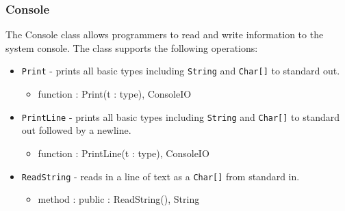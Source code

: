 \documentclass[12pt]{article}
\begin{document}
\subsubsection{Console}
The Console class allows programmers to read and write information to the system console.    The class supports the following operations:
\begin{itemize}
\item \texttt{Print} - prints all basic types including
  \texttt{String} and \texttt{Char[]} to standard out.
  \begin{itemize}
  \item function : Print(t : type), ConsoleIO
  \end{itemize}
\item \texttt{PrintLine} - prints all basic types including
  \texttt{String} and \texttt{Char[]} to standard out followed by a
  newline.
  \begin{itemize}
  \item function : PrintLine(t : type), ConsoleIO
  \end{itemize}
\item \texttt{ReadString} - reads in a line of text as a \texttt{Char[]} from standard in.
  \begin{itemize}
  \item method : public : ReadString(), String
  \end{itemize}
\end{itemize}
\end{document}
